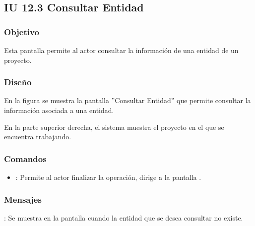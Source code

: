 \subsection{IU 12.3 Consultar Entidad}

\subsubsection{Objetivo}
	Esta pantalla permite al actor consultar la información de una entidad de un proyecto.
\subsubsection{Diseño}
	En la figura  se muestra la pantalla ''Consultar Entidad'' que permite consultar la información asociada  a una entidad.
	
	En la parte superior derecha, el sistema muestra el proyecto en el que se encuentra trabajando.

\subsubsection{Comandos}
\begin{itemize}
	\item {}: Permite al actor finalizar la operación, dirige a la pantalla .
\end{itemize}

\subsubsection{Mensajes}

\begin{Citemize}
	\item {}: Se muestra en la pantalla  cuando la entidad que se desea consultar no existe.
\end{Citemize}
